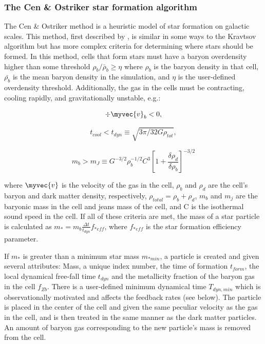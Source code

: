 \subsubsection{The Cen \& Ostriker star formation algorithm}

The Cen \& Ostriker method is a heuristic model of star formation
on galactic scales.  This method, first described by
\citet{CO1992}, is similar in some ways to the Kravtsov algorithm
but has more complex criteria for determining where stars should
be formed.  In this method, cells that form stars must have a 
baryon overdensity higher than some threshold 
$\rho_b/\bar{\rho}_b \geq \eta$ 
where $\rho_b$ is the baryon density in that cell, 
$\bar{\rho_b}$ is the mean baryon density in the simulation,
and $\eta$ is the user-defined overdensity threshold.
Additionally, the gas in the cells must be contracting, 
cooling rapidly, and gravitationally unstable, e.g.:

\begin{equation}
\div \myvec{v}_b < 0,
\label{cencont}
\end{equation}

\begin{equation}
t_{cool} < t_{dyn} \equiv \sqrt{3 \pi / 32G \rho_{tot}},
\end{equation}

\begin{equation}
m_{b} > m_{J} \equiv G^{-3/2} \rho_{b}^{-1/2}C^{3}
\left[ 1 + \frac{\delta\rho_{d}}{\delta\rho_{b}} \right]^{-3/2}
\end{equation}

where $\myvec{v}$ is the velocity of the gas in the cell, $\rho_{b}$ and 
$\rho_{d}$ are the cell's baryon and dark matter density, respectively,
$\rho_{total} = \rho_{b} + \rho_{d}$, $m_{b}$ and $m_{j}$ are the 
baryonic mass in the cell and jeans mass of the cell, and C is the 
isothermal sound speed in the cell.  
If all of these criteria are met, 
the mass of a star particle is calculated as \(m_{*} = m_{b} 
\frac{ \Delta t}{ t_{dyn} } f_{*eff} \), 
where $f_{*eff}$ is the star formation efficiency parameter.

If $m_{*}$ is greater than a minimum star mass $m_{*min}$, a particle 
is created and given several attributes:  Mass, a unique index number, 
the time of formation $t_{form}$, the local dynamical free-fall time 
$t_{dyn}$ and the metallicity fraction of the baryon gas in the cell 
$f_{Zb}$.  There is a user-defined minimum dynamical time
$T_{dyn,min}$ which is observationally motivated and affects the
feedback rates (see below).
The particle is placed in the center of the cell and given 
the same peculiar velocity as the gas in the cell, and is then treated 
in the same manner as the dark matter particles.  An 
amount of baryon gas corresponding to the new particle's mass is 
removed from the cell.  

